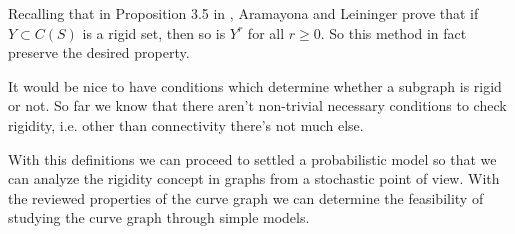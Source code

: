 Recalling that in Proposition 3.5 in \cite{exhaustionByRigidSets}, Aramayona and Leininger prove that if $Y \subset C(S)$ is a rigid set, then so is $Y^{r} $ for all $r \geq 0$. So this method in fact preserve the desired property.

It would be nice to have conditions which determine whether a subgraph is rigid or not. So far we know that there aren't non-trivial necessary conditions to check rigidity, i.e. other than connectivity there's not much else.

With this definitions we can proceed to settled a probabilistic model so that we can analyze the rigidity concept in graphs from a stochastic point of view. With the reviewed properties of the curve graph we can determine the feasibility of studying the curve graph through simple models.